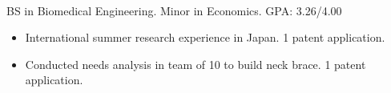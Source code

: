 \documentclass[a4paper, margin]{res}
\begin{document}
\begin{sloppypar}
\begin{resume}




\\
BS in Biomedical Engineering. Minor in Economics. GPA: 3.26/4.00
\begin{itemize}
    \item International summer research experience in Japan. 1 patent application.

    \item Conducted needs analysis in team of 10 to build neck brace. 1 patent application.


\end{itemize}
\end{resume}
\end{sloppypar}
\end{document}
